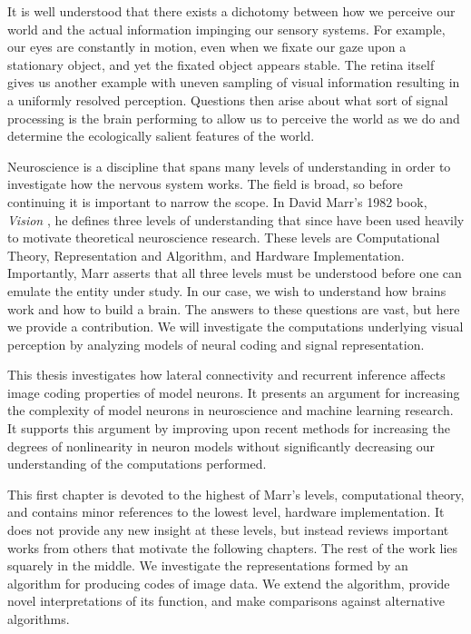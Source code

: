 It is well understood that there exists a dichotomy between how we perceive our world and the actual information impinging our sensory systems. For example, our eyes are constantly in motion, even when we fixate our gaze upon a stationary object, and yet the fixated object appears stable. The retina itself gives us another example with uneven sampling of visual information resulting in a uniformly resolved perception. Questions then arise about what sort of signal processing is the brain performing to allow us to perceive the world as we do and determine the ecologically salient features of the world. 

Neuroscience is a discipline that spans many levels of understanding in order to investigate how the nervous system works. The field is broad, so before continuing it is important to narrow the scope. In David Marr's 1982 book, \textit{Vision} \cite{marr1982vision}, he defines three levels of understanding that since have been used heavily to motivate theoretical neuroscience research. These levels are Computational Theory, Representation and Algorithm, and Hardware Implementation. Importantly, Marr asserts that all three levels must be understood before one can emulate the entity under study. In our case, we wish to understand how brains work and how to build a brain. The answers to these questions are vast, but here we provide a contribution. We will investigate the computations underlying visual perception by analyzing models of neural coding and signal representation.

This thesis investigates how lateral connectivity and recurrent inference affects image coding properties of model neurons. It presents an argument for increasing the complexity of model neurons in neuroscience and machine learning research. It supports this argument by improving upon recent methods for increasing the degrees of nonlinearity in neuron models without significantly decreasing our understanding of the computations performed.

This first chapter is devoted to the highest of Marr's levels, computational theory, and contains minor references to the lowest level, hardware implementation. It does not provide any new insight at these levels, but instead reviews important works from others that motivate the following chapters. The rest of the work lies squarely in the middle. We investigate the representations formed by an algorithm for producing codes of image data. We extend the algorithm, provide novel interpretations of its function, and make comparisons against alternative algorithms.

